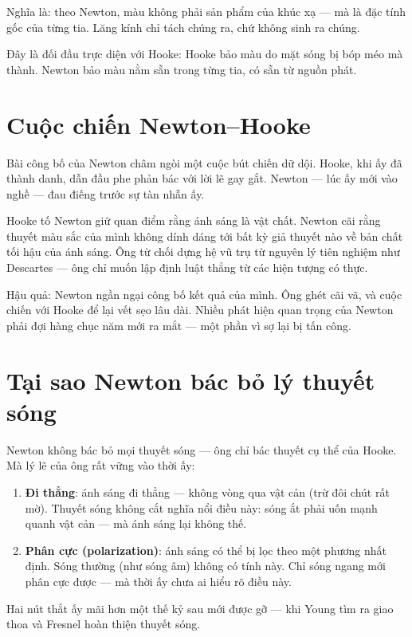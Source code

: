 Nghĩa là: theo Newton, màu không phải sản phẩm của khúc xạ — mà là đặc tính gốc của từng tia. Lăng kính chỉ tách chúng ra, chứ không sinh ra chúng.

Đây là đối đầu trực diện với Hooke: Hooke bảo màu do mặt sóng bị bóp méo mà thành. Newton bảo màu nằm sẵn trong từng tia, có sẵn từ nguồn phát.

\section{Cuộc chiến Newton–Hooke}

Bài công bố của Newton châm ngòi một cuộc bút chiến dữ dội. Hooke, khi ấy đã thành danh, dẫn đầu phe phản bác với lời lẽ gay gắt. Newton — lúc ấy mới vào nghề — đau điếng trước sự tàn nhẫn ấy.

Hooke tố Newton giữ quan điểm rằng ánh sáng là vật chất. Newton cãi rằng thuyết màu sắc của mình không dính dáng tới bất kỳ giả thuyết nào về bản chất tối hậu của ánh sáng. Ông từ chối dựng hệ vũ trụ từ nguyên lý tiên nghiệm như Descartes — ông chỉ muốn lập định luật thẳng từ các hiện tượng có thực.

Hậu quả: Newton ngần ngại công bố kết quả của mình. Ông ghét cãi vã, và cuộc chiến với Hooke để lại vết sẹo lâu dài. Nhiều phát hiện quan trọng của Newton phải đợi hàng chục năm mới ra mắt — một phần vì sợ lại bị tấn công.


\section{Tại sao Newton bác bỏ lý thuyết sóng}

Newton không bác bỏ mọi thuyết sóng — ông chỉ bác thuyết cụ thể của Hooke. Mà lý lẽ của ông rất vững vào thời ấy:

\begin{enumerate}
  \item \textbf{Đi thẳng}: ánh sáng đi thẳng — không vòng qua vật cản (trừ đôi chút rất mờ). Thuyết sóng không cắt nghĩa nổi điều này: sóng ắt phải uốn mạnh quanh vật cản — mà ánh sáng lại không thế.
  \item \textbf{Phân cực (polarization)}: ánh sáng có thể bị lọc theo một phương nhất định. Sóng thường (như sóng âm) không có tính này. Chỉ sóng ngang mới phân cực được — mà thời ấy chưa ai hiểu rõ điều này.
\end{enumerate}

Hai nút thắt ấy mãi hơn một thế kỷ sau mới được gỡ — khi Young tìm ra giao thoa và Fresnel hoàn thiện thuyết sóng.


